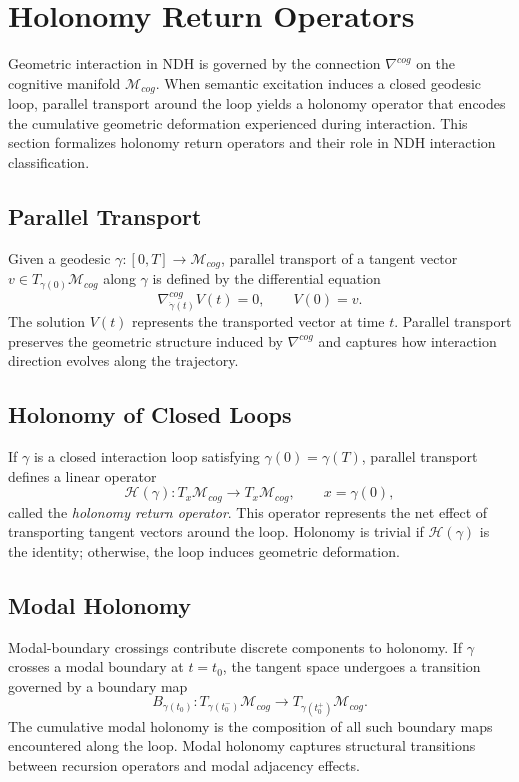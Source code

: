 \section{Holonomy Return Operators}
\label{sec:holonomy-return}

Geometric interaction in NDH is governed by the connection $\nabla^{cog}$ on the
cognitive manifold $\mathcal{M}_{cog}$. When semantic excitation induces a
closed geodesic loop, parallel transport around the loop yields a holonomy
operator that encodes the cumulative geometric deformation experienced during
interaction. This section formalizes holonomy return operators and their role
in NDH interaction classification.

\subsection{Parallel Transport}

Given a geodesic $\gamma : [0,T] \to \mathcal{M}_{cog}$, parallel transport of a
tangent vector $v \in T_{\gamma(0)}\mathcal{M}_{cog}$ along $\gamma$ is defined
by the differential equation
\[
\nabla^{cog}_{\dot{\gamma}(t)} V(t) = 0,
\qquad V(0) = v.
\]
The solution $V(t)$ represents the transported vector at time $t$. Parallel
transport preserves the geometric structure induced by $\nabla^{cog}$ and
captures how interaction direction evolves along the trajectory.

\subsection{Holonomy of Closed Loops}

If $\gamma$ is a closed interaction loop satisfying $\gamma(0) = \gamma(T)$,
parallel transport defines a linear operator
\[
\mathcal{H}(\gamma) : T_x \mathcal{M}_{cog} \to T_x \mathcal{M}_{cog},
\qquad x = \gamma(0),
\]
called the \emph{holonomy return operator}. This operator represents the net
effect of transporting tangent vectors around the loop. Holonomy is trivial if
$\mathcal{H}(\gamma)$ is the identity; otherwise, the loop induces geometric
deformation.

\subsection{Modal Holonomy}

Modal-boundary crossings contribute discrete components to holonomy. If
$\gamma$ crosses a modal boundary at $t = t_0$, the tangent space undergoes a
transition governed by a boundary map
\[
B_{\gamma(t_0)} : T_{\gamma(t_0^-)}\mathcal{M}_{cog}
                 \to T_{\gamma(t_0^+)}\mathcal{M}_{cog}.
\]
The cumulative modal holonomy is the composition of all such boundary maps
encountered along the loop. Modal holonomy captures structural transitions
between recursion operators and modal adjacency effects.

